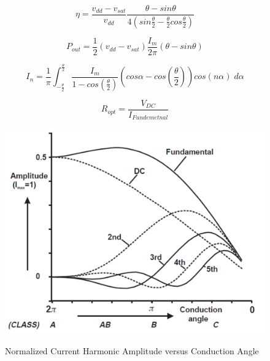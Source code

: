 \begin{equation}\label{eq:cond_eff}
  \eta = \frac{v_{dd} - v_{sat}}{v_{dd}} \frac{\theta - sin\theta}{4(sin\frac{\theta}{2} - \frac{\theta}{2} cos\frac{\theta}{2}) }
\end{equation}

\begin{equation}\label{eq:cond_pout}
  P_{out} = \frac{1}{2}(v_{dd} - v_{sat} )\frac{I_m}{2\pi}(\theta - sin\theta)
\end{equation}

\begin{equation}\label{eq:cond_current}
  I_n = \frac{1}{\pi}\int_{-\frac{\theta}{2}}^{\frac{\theta}{2}} \frac{I_m}{1 - cos(\frac{\theta}{2})} (cos\alpha - cos(\frac{\theta}{2}))cos(n\alpha) \; d\alpha
\end{equation}

\begin{equation}\label{eq:opt_load}
  R_{opt} = \frac{V_{DC}}{I_{Fundemetnal}}
\end{equation}

\begin{figure}
  \centering
  \includegraphics[width=6in]{figures/classes/bias_current_harmonic}\\
  \caption{Normalized Current Harmonic Amplitude versus Conduction Angle \cite{C.Cripps2006}}\label{fig:bias_current_harmonic}
\end{figure}

